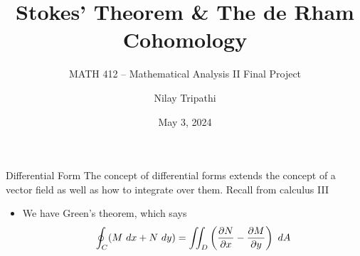 \documentclass{beamer}
\title[de Rham Cohomology]{Stokes' Theorem \& The de Rham Cohomology}
\subtitle{MATH 412 -- Mathematical Analysis II Final Project}
\author{Nilay Tripathi}
\date{May 3, 2024}
\begin{document}
		\maketitle
		
		\begin{frame}{Differential Form}
				The concept of \alert{differential forms} extends the concept of a vector field as well as how to integrate over them. Recall from calculus III 
				\begin{itemize}
						\item We have \alert{Green's theorem}, which says 
								\begin{equation*}
										\oint_{C} (M\ dx + N\ dy) = \iint_{D} \left( \frac{\prtl N}{\prtl x} - \frac{\prtl M}{\prtl y}  \right)\ dA
								\end{equation*}
				\end{itemize}
				\begin{figure}[H]
						\centering
						
				\end{figure}
		\end{frame}
\end{document}
